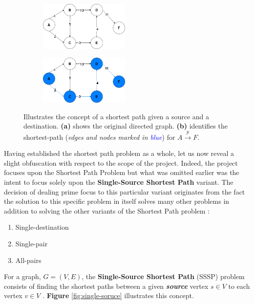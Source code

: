 \documentclass[a4paper]{article}
\begin{document}
\begin{figure}[H]
    \begin{center}
      \begin{subfigure}{.5\textwidth}
        \includegraphics[width=1.75in]{shortest_path_original.png}
        \caption{}
      \end{subfigure}%
      \begin{subfigure}{.4\textwidth}
        \includegraphics[width=1.75in]{shortest_path_solved.png}
        \caption{}
      \end{subfigure}
    \end{center}
    \caption{Illustrates the concept of a shortest path given a source and a destination. \textbf{(a)} shows the original directed graph. \textbf{(b)} identifies the shortest-path (\emph{edges and nodes marked in \textcolor{blue}{blue}}) for $A \xrightarrow{p} F$.\cite{wikipediaImg}}
    \label{fig:short-path}
\end{figure}


\noindent
Having established the shortest path problem as a whole, let us now reveal a slight obfuscation with respect to the scope of the project. Indeed, the project focuses upon the Shortest Path Problem but what was omitted earlier was the intent to focus solely upon the \textbf{Single-Source Shortest Path}
variant. The decision of dealing prime focus to this particular variant originates from the fact the solution to this specific problem in itself solves many other problems in addition to solving the other variants of the Shortest Path problem \cite{cormenBk,sedgewickBk}:

\begin{enumerate}
    \item Single-destination
    \item Single-pair
    \item All-pairs
\end{enumerate}

\noindent
For a graph, $G = (V, E)$, the \textbf{Single-Source Shortest Path} (SSSP) problem consists of finding the shortest paths between a given \textbf{\emph{source}} vertex $s \in V$ to each vertex $v \in V$ \cite{cormenBk,chaupis-et.al:2017}. \textbf{Figure} \ref{fig:single-soruce} illustrates this concept.
\end{document}
